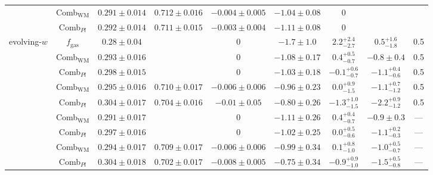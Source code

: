 \documentclass[useAMS,usenatbib,usegraphicx]{mn2e}
\newcommand*{\mysub}[2]{\ensuremath{#1_{\mathrm{#2}}}}
\newcommand*{\phmin}{\hspace{1.9ex}}
\newcommand*{\fgas}{\mysub{f}{gas}}
\begin{document}
\begin{table}
\begin{center}
\begin{tabular}{ccccccccc}
      & Comb$_\mathrm{WM}$ & $0.291\pm0.014$ & $0.712\pm0.016$ & $-0.004\pm0.005$ & $-1.04\pm0.08$ &  \phmin0 & &\vspace{1ex}\\
      & Comb$_{Pl}$ & $0.292\pm0.014$ & $0.711\pm0.015$ & $-0.003\pm0.004$ & $-1.11\pm0.08$ & \phmin0 &  &\vspace{1ex}\\
      evolving-$w$ & \fgas{} & $0.28\pm0.04$ &  & \phmin0 & $-1.7\pm1.0$ & \phmin$2.2^{+2.4}_{-2.7}$ & \phmin$0.5^{+1.6}_{-1.8}$ & 0.5\vspace{1ex}\\
      & Comb$_\mathrm{WM}$ & $0.293\pm0.016$ & & \phmin0 & $-1.08\pm0.17$ & \phmin$0.4^{+0.5}_{-0.7}$ & $-0.8\pm0.4$ & 0.5\vspace{1ex}\\
      & Comb$_{Pl}$ & $0.298\pm0.015$ & & \phmin0 & $-1.03\pm0.18$ & $-0.1^{+0.6}_{-0.7}$ & $-1.1^{+0.4}_{-0.6}$ & 0.5\vspace{1ex}\\
      & Comb$_\mathrm{WM}$ & $0.295\pm0.016$ & $0.710\pm0.017$ & $-0.006\pm0.006$ & $-0.96\pm0.23$ & \phmin$0.0^{+0.9}_{-1.5}$ & $-1.1^{+0.7}_{-1.2}$ & 0.5\vspace{1ex}\\
      & Comb$_{Pl}$ & $0.304\pm0.017$ & $0.704\pm0.016$ & $-0.01\pm0.05$ & $-0.80\pm0.26$ & $-1.3^{+1.0}_{-1.5}$ & $-2.2^{+0.9}_{-1.2}$ & 0.5\vspace{1ex}\\
      & Comb$_\mathrm{WM}$ & $0.291\pm0.017$ &  & \phmin0 & $-1.11\pm0.26$ & \phmin$0.4^{+0.4}_{-0.7}$ & $-0.9\pm0.3$ & ---\vspace{1ex}\\
      & Comb$_{Pl}$ & $0.297\pm0.016$ &  & \phmin0 & $-1.02\pm0.25$ & \phmin$0.0^{+0.5}_{-0.6}$ & $-1.1^{+0.2}_{-0.3}$ & ---\vspace{1ex}\\
      & Comb$_\mathrm{WM}$ & $0.294\pm0.017$ & $0.709\pm0.017$ & $-0.006\pm0.006$ & $-0.99\pm0.34$ & \phmin$0.1^{+0.8}_{-1.0}$ & $-1.0^{+0.5}_{-0.7}$ & ---\vspace{1ex}\\
      & Comb$_{Pl}$ & $0.304\pm0.018$ & $0.702\pm0.017$ & $-0.008\pm0.005$ & $-0.75\pm0.34$ & $-0.9^{+0.9}_{-1.0}$ & $-1.5^{+0.5}_{-0.8}$ & ---\vspace{1ex}\\
   \hline
    \end{tabular}
  \end{center}
\end{table}
\end{document}
